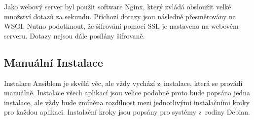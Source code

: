 \documentclass[thesis=M,czech]{src/FITthesis}[2019/12/23]
\begin{document}
Jako webový server byl použit software Nginx, který zvládá obsloužit velké množství dotazů za sekundu. Příchozí dotazy jsou následně přesměrovány na WSGI. Nutno podotknout, že šifrování pomocí SSL je nastaveno na webovém serveru. Dotazy nejsou dále posílány šifrovaně.  

\subsection{Manuální Instalace}
\label{sec:instalation}
Instalace Ansiblem je skvělá věc, ale vždy vychází z~instalace, která se provádí manuálně. Instalace všech aplikací jsou velice podobné proto bude popsána jedna instalace, ale vždy bude zmíněna rozdílnost mezi jednotlivými \linebreak instalačními kroky pro každou aplikaci. Instalační kroky jsou popsány pro systémy z~rodiny Debian. 
\end{document}
